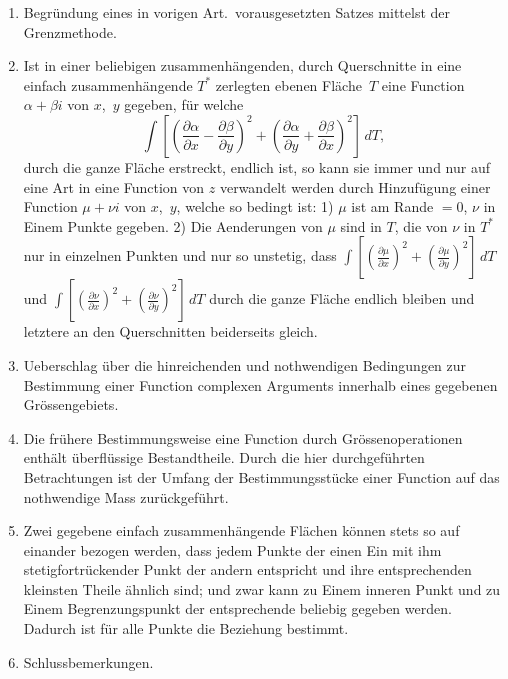 \documentclass[a4paper,12pt]{article}
\begin{document}
\begin{enumerate}
\item
Begr\"{u}ndung eines in vorigen Art.\ vorausgesetzten Satzes
mittelst der Grenzmethode.

\item
Ist in einer beliebigen zusammenh\"{a}ngenden, durch Querschnitte
in eine einfach zusammenh\"{a}ngende $T^*$ zerlegten ebenen
Fl\"{a}che~$T$ eine Function $\alpha + \beta i$ von $x$,~$y$
gegeben, f\"{u}r welche
\[ \int
      \left[
         \left(
            \frac{\partial \alpha}{\partial x}
          - \frac{\partial \beta }{\partial y}
         \right)^2
       + \left(
            \frac{\partial \alpha}{\partial y}
          + \frac{\partial \beta }{\partial x}
         \right)^2
      \right] \, dT,\]
durch die ganze Fl\"{a}che erstreckt, endlich ist, so kann sie
immer und nur auf eine Art in eine Function von $z$ verwandelt
werden durch Hinzuf\"{u}gung einer Function $\mu + \nu i$ von
$x$,~$y$, welche so bedingt ist: 1) $\mu$ ist am Rande $= 0$,
$\nu$ in Einem Punkte gegeben.  2) Die Aenderungen von $\mu$ sind
in $T$, die von $\nu$ in $T^*$ nur in einzelnen Punkten und nur
so unstetig, dass
$\displaystyle \int
      \left[
         \left( \frac{\partial \mu}{\partial x} \right)^2
       + \left( \frac{\partial \mu}{\partial y} \right)^2
      \right] \, dT$
und
$\displaystyle \int
      \left[
         \left( \frac{\partial \nu}{\partial x} \right)^2
       + \left( \frac{\partial \nu}{\partial y} \right)^2
      \right] \, dT$
durch die ganze Fl\"{a}che endlich bleiben und letztere an den
Querschnitten beiderseits gleich.

\item
Ueberschlag \"{u}ber die hinreichenden und nothwendigen
Bedingungen zur Bestimmung einer Function complexen Arguments
innerhalb eines gegebenen Gr\"{o}ssengebiets.

\item
Die fr\"{u}here Bestimmungsweise eine Function durch
Gr\"{o}ssenoperationen enth\"{a}lt \"{u}berfl\"{u}ssige
Bestandtheile.  Durch die hier durchgef\"{u}hrten Betrachtungen
ist der Umfang der Bestimmungsst\"{u}cke einer Function auf das
nothwendige Mass zur\"{u}ckgef\"{u}hrt.

\item
Zwei gegebene einfach zusammenh\"{a}ngende Fl\"{a}chen k\"{o}nnen
stets so auf einander bezogen werden, dass jedem Punkte der einen
Ein mit ihm stetigfortr\"{u}ckender Punkt der andern entspricht
und ihre entsprechenden kleinsten Theile \"{a}hnlich sind; und
zwar kann zu Einem inneren Punkt und zu Einem Begrenzungspunkt
der entsprechende beliebig gegeben werden.  Dadurch ist f\"{u}r
alle Punkte die Beziehung bestimmt.

\item
Schlussbemerkungen.

\end{enumerate}
\end{document}
